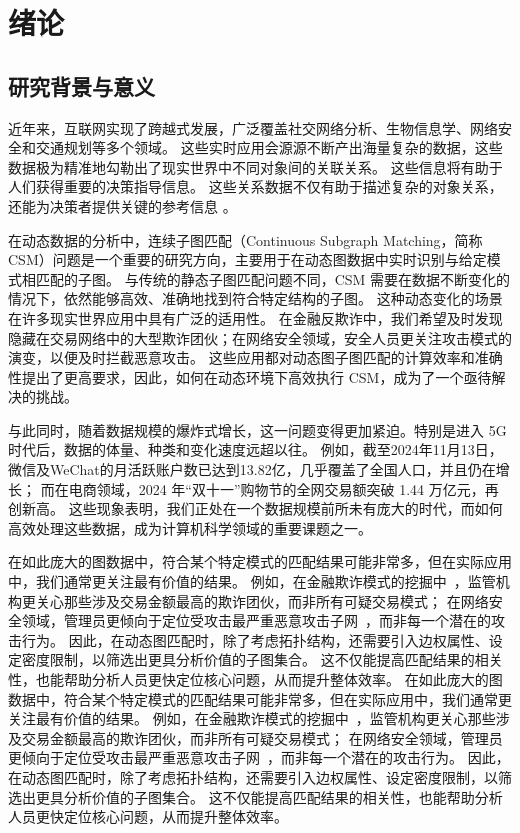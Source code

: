 \chapter{绪论}
\section{研究背景与意义}
近年来，互联网实现了跨越式发展，广泛覆盖社交网络分析、生物信息学、网络安全和交通规划等多个领域。
这些实时应用会源源不断产出海量复杂的数据，这些数据极为精准地勾勒出了现实世界中不同对象间的关联关系。
这些信息将有助于人们获得重要的决策指导信息。
这些关系数据不仅有助于描述复杂的对象关系，还能为决策者提供关键的参考信息 。


在动态数据的分析中，连续子图匹配（Continuous Subgraph Matching，简称CSM）问题是一个重要的研究方向，主要用于在动态图数据中实时识别与给定模式相匹配的子图。
与传统的静态子图匹配问题不同，CSM 需要在数据不断变化的情况下，依然能够高效、准确地找到符合特定结构的子图。
这种动态变化的场景在许多现实世界应用中具有广泛的适用性。
在金融反欺诈中，我们希望及时发现隐藏在交易网络中的大型欺诈团伙；在网络安全领域，安全人员更关注攻击模式的演变，以便及时拦截恶意攻击。
这些应用都对动态图子图匹配的计算效率和准确性提出了更高要求，因此，如何在动态环境下高效执行 CSM，成为了一个亟待解决的挑战。

与此同时，随着数据规模的爆炸式增长，这一问题变得更加紧迫。特别是进入 5G 时代后，数据的体量、种类和变化速度远超以往。
例如，截至2024年11月13日，微信及WeChat的月活跃账户数已达到13.82亿，几乎覆盖了全国人口，并且仍在增长；
而在电商领域，2024 年“双十一”购物节的全网交易额突破 1.44 万亿元，再创新高。
这些现象表明，我们正处在一个数据规模前所未有庞大的时代，而如何高效处理这些数据，成为计算机科学领域的重要课题之一。

在如此庞大的图数据中，符合某个特定模式的匹配结果可能非常多，但在实际应用中，我们通常更关注最有价值的结果。
例如，在金融欺诈模式的挖掘中~\cite{csm-cycle-DBLP:journals/pvldb/QiuCQPZLZ18}，监管机构更关心那些涉及交易金额最高的欺诈团伙，而非所有可疑交易模式；
在网络安全领域，管理员更倾向于定位受攻击最严重恶意攻击子网~\cite{traffic-graph-matching-DBLP:journals/pvldb/SongGCW14}，而非每一个潜在的攻击行为。
因此，在动态图匹配时，除了考虑拓扑结构，还需要引入边权属性、设定密度限制，以筛选出更具分析价值的子图集合。
这不仅能提高匹配结果的相关性，也能帮助分析人员更快定位核心问题，从而提升整体效率。
在如此庞大的图数据中，符合某个特定模式的匹配结果可能非常多，但在实际应用中，我们通常更关注最有价值的结果。
例如，在金融欺诈模式的挖掘中~\cite{csm-cycle-DBLP:journals/pvldb/QiuCQPZLZ18}，监管机构更关心那些涉及交易金额最高的欺诈团伙，而非所有可疑交易模式；
在网络安全领域，管理员更倾向于定位受攻击最严重恶意攻击子网~\cite{traffic-graph-matching-DBLP:journals/pvldb/SongGCW14}，而非每一个潜在的攻击行为。
因此，在动态图匹配时，除了考虑拓扑结构，还需要引入边权属性、设定密度限制，以筛选出更具分析价值的子图集合。
这不仅能提高匹配结果的相关性，也能帮助分析人员更快定位核心问题，从而提升整体效率。

